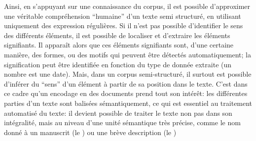 

Ainsi, en s'appuyant sur une connaissance du corpus, il est possible d'approximer une véritable compréhension \enquote{humaine} d'un texte semi structuré, en utilisant uniquement des \glspl{expression régulière}. Si il n'est pas possible d'identifier le sens des différents éléments, il est possible de localiser et d'extraire les éléments signifiants. Il apparaît alors que ces éléments signifiants sont, d'une certaine manière, des formes, ou des motifs qui peuvent être détectés automatiquement; la signification peut être identifiée en fonction du type de donnée extraite (un nombre est une date). Mais, dans un corpus semi-structuré, il surtout est possible d'inférer du \enquote{sens} d'un élément à partir de sa position dans le texte. C'est dans ce cadre qu'un encodage en \xmltei{} des documents prend tout son intérêt: les différentes parties d'un texte sont balisées sémantiquement, ce qui est essentiel au traitement automatisé du texte: il devient possible de traiter le texte non pas dans son intégralité, mais au niveau d'une unité sémantique très précise, comme le nom donné à un manuscrit (le \tname{}) ou une brève description (le \ttrait{})

